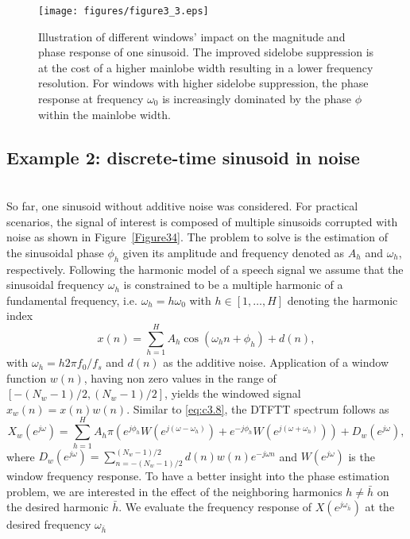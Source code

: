 \begin{figure}[t]
	\center %
	\texttt{[image: figures/figure3\_3.eps]}
	\caption{Illustration of different windows' impact on the magnitude and phase response of one sinusoid. The improved sidelobe suppression is at the cost of a higher mainlobe width resulting in a lower frequency resolution. For windows with higher sidelobe suppression, the phase response at frequency $\omega_0$ is increasingly dominated by the phase $\phi$ within the mainlobe width.}\label{Figure33}
\end{figure}

%
\subsection{Example 2: discrete-time sinusoid in noise}~\\
So far, one sinusoid without additive noise was considered. For practical scenarios, the signal of interest is composed of multiple sinusoids corrupted with noise as shown in Figure~\ref{Figure34}. The problem to solve is the estimation of the sinusoidal phase ${\phi}_{h}$ given its amplitude and frequency denoted as $A_h$ and ${\omega}_h$, respectively. Following the harmonic model of a speech signal we assume that the sinusoidal frequency ${\omega}_h$ is constrained to be a multiple harmonic of a fundamental frequency, i.e. ${\omega}_h=h{\omega}_0$ with $h\in[1,\ldots,H]$ denoting the harmonic index
\begin{equation}\label{eq:c3.11}
x(n)=\sum_{h=1}^H{A_h\cos({\omega}_hn+{\phi}_h)}+d(n),
\end{equation}
with $\omega_h=h2\pi f_0/f_s$ and $d(n)$ as the additive noise. Application of a window function $w(n)$, having non zero values in the range of $[-(N_w-1)/2,(N_w-1)/2]$, yields the windowed signal $x_w(n)=x(n)w(n)$. Similar to \eqref{eq:c3.8}, the \gls{DTFT}T spectrum follows as
\begin{equation}\label{eq:c3.12}
X_w(e^{j\omega})=\sum_{h=1}^{H} A_h\pi \left( e^{j{\phi}_h}W(e^{j(\omega-{\omega}_h)}) + e^{-j{\phi}_h}W(e^{j(\omega+{\omega}_h)})\right)+D_w(e^{j\omega}),
\end{equation}
where $D_w(e^{j\omega})=\sum_{n=-(N_w-1)/2}^{(N_w-1)/2}{d(n)w(n)e^{-j{\omega}n}}$ and $W(e^{j\omega})$ is the window frequency response. To have a better insight into the phase estimation problem, we are interested in the effect of the neighboring harmonics $h\neq \bar{h}$ on the desired harmonic $\bar{h}$. We evaluate the frequency response of $X(e^{j\omega_{\bar{h}}})$ at the desired frequency ${\omega}_{\bar{h}}$
